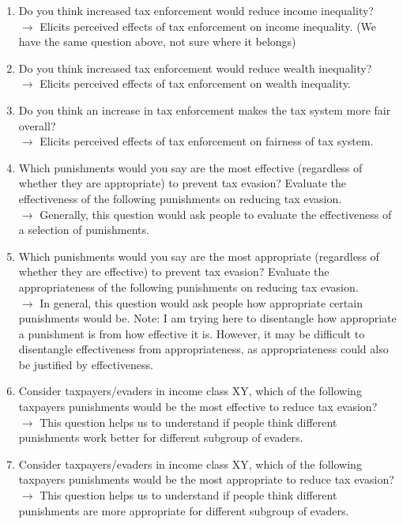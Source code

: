 \documentclass[12pt]{article}
\begin{document}
\begin{enumerate}
    \item Do you think increased tax enforcement would reduce income inequality? \\ $\rightarrow$ Elicits perceived effects of tax enforcement on income inequality. (We have the same question above, not sure where it belongs)
    \item Do you think increased tax enforcement would reduce wealth inequality? \\ $\rightarrow$ Elicits perceived effects of tax enforcement on wealth inequality. 
    \item Do you think an increase in tax enforcement makes the tax system more fair overall? \\ $\rightarrow$ Elicits perceived effects of tax enforcement on fairness of tax system. 
    \item Which punishments would you say are the most effective (regardless of whether they are appropriate) to prevent tax evasion? Evaluate the effectiveness of the following punishments on reducing tax evasion. \\ $\rightarrow$ Generally, this question would ask people to evaluate the effectiveness of a selection of punishments.
    \item Which punishments would you say are the most appropriate (regardless of whether they are effective) to prevent tax evasion? Evaluate the appropriateness of the following punishments on reducing tax evasion. \\ $\rightarrow$ In general, this question would ask people how appropriate certain punishments would be. Note: I am trying here to disentangle how appropriate a punishment is from how effective it is. However, it may be difficult to disentangle effectiveness from appropriateness, as appropriateness could also be justified by effectiveness. 
    \item Consider taxpayers/evaders in income class XY, which of the following taxpayers punishments would be the most effective to reduce tax evasion? \\ $\rightarrow$ This question helps us to understand if people think different punishments work better for different subgroup of evaders. 
    \item Consider taxpayers/evaders in income class XY, which of the following taxpayers punishments would be the most appropriate to reduce tax evasion? \\ $\rightarrow$ This question helps us to understand if people think different punishments are more appropriate for different subgroup of evaders. 
\end{enumerate}
\end{document}
